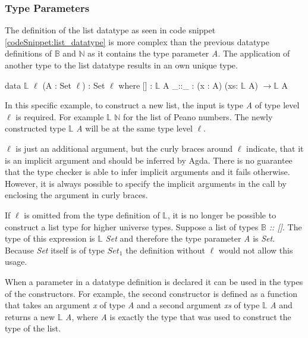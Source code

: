 \subsubsection{Type Parameters}
The definition of the list datatype as seen in code snippet \ref{codeSnippet:list_datatype} is more complex than the previous datatype definitions of $\mathbb{B}$ and $\mathbb{N}$ as it contains the type parameter \emph{A}.
The application of another type to the list datatype results in an own unique type.

\begin{codesnippet}[mathescape=true, caption={Definition of the list datatype in Agda}, label={codeSnippet:list_datatype}]
data $\mathbb{L}$ {$\ell$} (A : Set $\ell$) : Set $\ell$ where
  [] : $\mathbb{L}$ A
  _::_ : (x : A) (xs: $\mathbb{L}$ A) $\rightarrow \mathbb{L}$ A
\end{codesnippet}

In this specific example, to construct a new list, the input is type \emph{A} of type level $\ell$  is required. For example $\mathbb{L}$ $\mathbb{N}$ for the list of Peano numbers.
The newly constructed type $\mathbb{L}$ \emph{A} will be at the same type level $\ell$.

$\ell$ is just an additional argument, but the curly braces around $\ell$ indicate, that it is an implicit argument and should be inferred by Agda.
There is no guarantee that the type checker is able to infer implicit arguments and it fails otherwise.
However, it is always possible to specify the implicit arguments in the call by enclosing the argument in curly braces\cite{norell:deptyped}.

If $\ell$ is omitted from the type definition of $\mathbb{L}$, it is no longer be possible to construct a list type for higher universe types.
Suppose a list of types \emph{$\mathbb{B}$ :: []}. 
The type of this expression is \emph{$\mathbb{L}$ Set} and therefore the type parameter \emph{A} is \emph{Set}. 
Because \emph{Set} itself is of type $Set_1$ the definition without $\ell$ would not allow this usage.

When a parameter in a datatype definition is declared it can be used in the types of the constructors.
For example, the second constructor is defined as a function that takes an argument \emph{x} of type \emph{A} and a second argument \emph{xs} of type $\mathbb{L}$ \emph{A} and returns a new $\mathbb{L}$ \emph{A}, where \emph{A} is exactly the type that was used to construct the type of the list.

